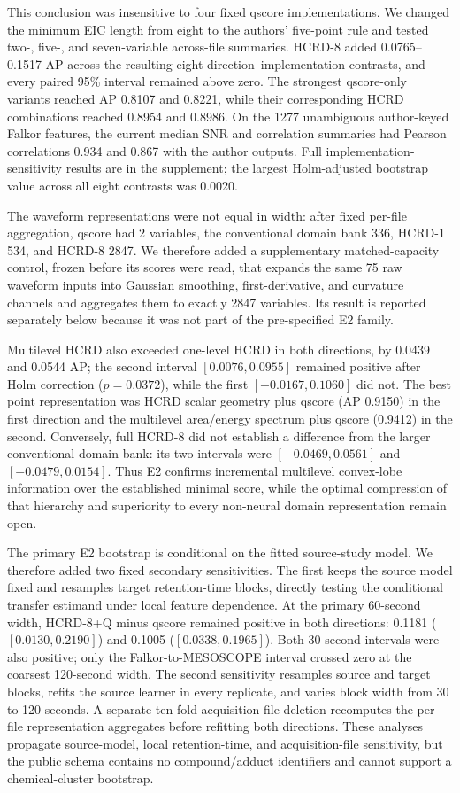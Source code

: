 \documentclass[review,onefignum,onetabnum]{siamonline250211}
\begin{document}
This conclusion was insensitive to four fixed qscore implementations.  We
changed the minimum EIC length from eight to the authors' five-point rule and
tested two-, five-, and seven-variable across-file summaries.  HCRD-8 added
0.0765--0.1517 AP across the resulting eight direction--implementation
contrasts, and every paired 95\% interval remained above zero.  The strongest
qscore-only variants reached AP 0.8107 and 0.8221, while their corresponding
HCRD combinations reached 0.8954 and 0.8986.  On the 1277 unambiguous
author-keyed Falkor features, the current median SNR and correlation summaries
had Pearson correlations 0.934 and 0.867 with the author outputs.  Full
implementation-sensitivity results are in the supplement; the largest
Holm-adjusted bootstrap value across all eight contrasts was 0.0020.

The waveform representations were not equal in width: after fixed per-file
aggregation, qscore had 2 variables, the conventional domain bank 336,
HCRD-1 534, and HCRD-8 2847.  We therefore added a supplementary matched-capacity
control, frozen before its scores were read, that expands the same 75 raw
waveform inputs into Gaussian smoothing, first-derivative, and curvature
channels and aggregates them to exactly 2847 variables.  Its result is
reported separately below because it was not part of the pre-specified E2
family.

Multilevel HCRD also exceeded one-level HCRD in both directions, by 0.0439 and
0.0544 AP; the second interval $[0.0076,0.0955]$ remained positive after Holm
correction ($p=0.0372$), while the first $[-0.0167,0.1060]$ did not.  The best
point representation was HCRD scalar geometry plus qscore (AP 0.9150) in the
first direction and the multilevel area/energy spectrum plus qscore (0.9412) in
the second.  Conversely, full HCRD-8 did not establish a difference from the
larger conventional domain bank: its two intervals were
$[-0.0469,0.0561]$ and $[-0.0479,0.0154]$.  Thus E2 confirms incremental
multilevel convex-lobe information over the established minimal score, while
the optimal compression of that hierarchy and superiority to every non-neural
domain representation remain open.

The primary E2 bootstrap is conditional on the fitted source-study model.
We therefore added two fixed secondary sensitivities.  The first keeps the
source model fixed and resamples target retention-time blocks, directly
testing the conditional transfer estimand under local feature dependence.  At
the primary 60-second width, HCRD-8+Q minus qscore remained positive in both
directions: 0.1181 ($[0.0130,0.2190]$) and 0.1005
($[0.0338,0.1965]$).  Both 30-second intervals were also positive; only the
Falkor-to-MESOSCOPE interval crossed zero at the coarsest 120-second width.
The second sensitivity resamples source and target blocks, refits the source
learner in every replicate, and varies block width from 30 to 120 seconds.  A
separate ten-fold
acquisition-file deletion recomputes the per-file representation aggregates
before refitting both directions.  These analyses propagate source-model,
local retention-time, and acquisition-file sensitivity, but the public schema
contains no compound/adduct identifiers and cannot support a chemical-cluster
bootstrap.
\end{document}
